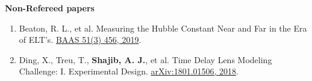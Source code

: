 \documentclass[11pt]{article}
\begin{document}

\textbf{Non-Refereed papers}
\begin{enumerate}
	\item Beaton, R. L., et al. Measuring the Hubble Constant Near and Far in the Era of ELT's. \href{https://ui.adsabs.harvard.edu/abs/2019BAAS...51c.456B/abstract}{BAAS 51(3) 456, 	2019}.
	\item Ding, X., Treu, T., {\bf Shajib, A. J.}, et al. Time Delay Lens Modeling Challenge: I. Experimental Design. \href{https://arxiv.org/abs/1801.01506}{arXiv:1801.01506, 2018}.
\end{enumerate}
\end{document}
